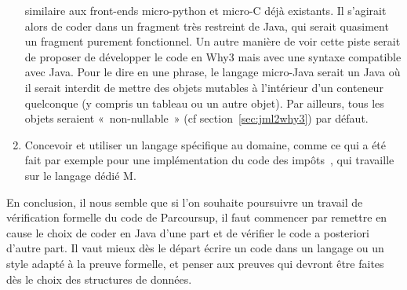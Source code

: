 \documentclass[a4paper]{report}
\begin{document}
\begin{enumerate}
  similaire aux front-ends micro-python et micro-C déjà existants. Il s'agirait
  alors de coder dans un fragment très restreint de Java, qui serait quasiment
  un fragment purement fonctionnel. Un autre manière de voir cette piste serait
  de proposer de développer le code en Why3 mais avec une syntaxe compatible
  avec Java. Pour le dire en une phrase, le langage micro-Java serait un Java où
  il serait interdit de mettre des objets mutables à l'intérieur d'un conteneur
  quelconque (y compris un tableau ou un autre objet). Par ailleurs, tous les
  objets seraient «~non-nullable~» (cf section~\ref{sec:jml2why3}) par défaut.
\item Concevoir et utiliser un langage spécifique au domaine, comme ce qui a été
  fait par exemple pour une implémentation du code des
  impôts~\cite{merigoux20jfla}, qui travaille sur le langage dédié M.
\end{enumerate}
En conclusion, il nous semble que si l'on souhaite poursuivre un travail de
vérification formelle du code de Parcoursup, il faut commencer par remettre en
cause le choix de coder en Java d'une part et de vérifier le code a posteriori
d'autre part. Il vaut mieux dès le départ écrire un code dans un langage ou un
style adapté à la preuve formelle, et penser aux preuves qui devront être faites
dès le choix des structures de données.


\end{document}
